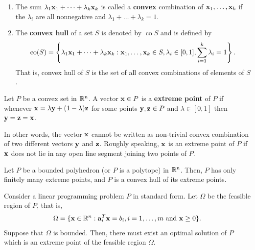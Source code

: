 \begin{enumerate}[label=(\arabic*)]
    \item The sum \(\lambda_1 \mathbf{x}_1 + \cdots + \lambda_k \mathbf{x}_k\) is called a \textbf{convex} combination of \(\mathbf{x}_1, \dots, \mathbf{x}_k\) if the \(\lambda_i\) are all nonnegative and \(\lambda_1 + \dots + \lambda_k = 1\).
    \item The \textbf{convex hull} of a set \(S\) is denoted by \(\operatorname{co}S\) and is defined by
          \[\operatorname{co}(S) = \left\{\lambda_1 \mathbf{x}_1 + \cdots + \lambda_k \mathbf{x}_k : \mathbf{x}_1, \dots, \mathbf{x}_k \in S, \lambda_i \in [0, 1], \sum_{i = 1}^k \lambda_i = 1\right\}.\]
          That is, convex hull of \(S\) is the set of all convex combinations of elements of \(S\).
\end{enumerate}

Let \(P\) be a convex set in \(\mathbb{R}^n\). A vector \(\mathbf{x} \in P\) is a \textbf{extreme point} of \(P\) if whenever \(\mathbf{x} = \lambda \mathbf{y} + (1 - \lambda)\mathbf{z}\) for some points \(\mathbf{y}, \mathbf{z} \in P\) and \(\lambda \in [0, 1]\) then \(\mathbf{y} = \mathbf{z} = \mathbf{x}\).

In other words, the vector \(\mathbf{x}\) cannot be written as non-trivial convex combination of two different vectors \(\mathbf{y}\) and \(\mathbf{z}\). Roughly speaking, \(\mathbf{x}\) is an extreme point of \(P\) if \(\mathbf{x}\) does not lie in any open line segment joining two points of \(P\).

\begin{theorem}
    Let \(P\) be a bounded polyhedron (or \(P\) is a polytope) in \(\mathbb{R}^n\). Then, \(P\) has only finitely many extreme points, and \(P\) is a convex hull of its extreme points.
\end{theorem}

\begin{theorem}
    Consider a linear programming problem \(P\) in standard form. Let \(\Omega\) be the feasible region of \(P\), that is,
    \[\Omega = \{\mathbf{x} \in \mathbb{R}^n: \mathbf{a}_i^T \mathbf{x} = b_i, i = 1, \dots, m \text{ and } \mathbf{x} \geq 0\}.\]
    Suppose that \(\Omega\) is bounded. Then, there must exist an optimal solution of \(P\) which is an extreme point of the feasible region \(\Omega\).
\end{theorem}

